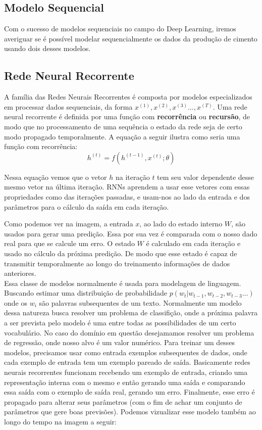 \subsection{Modelo Sequencial}
Com o sucesso de modelos sequenciais no campo do Deep Learning, iremos averiguar se é possível modelar sequencialmente os dados da produção de cimento usando dois desses modelos. 
\\

\subsection{Rede Neural Recorrente}
% 

A família das Redes Neurais Recorrentes é composta por modelos especializados
em processar dados sequenciais, da forma $x^{(1)},x^{(2)} ,x^{(3)}\dots ,x^{(T)}$. Uma rede neural recorrente é definida por uma função com
\textbf{recorrência} ou \textbf{recursão}, de modo que no processamento de uma
sequência o estado da rede seja de certo modo propagado temporalmente. A equação
a seguir ilustra como seria uma função com recorrência: \\

\[h^{(t)} = f(h^{(t-1)},x^{(t)};\theta)\]

Nessa equação vemos que o vetor $h$ na iteração $t$ tem seu valor dependente
desse mesmo vetor na última iteração. RNNs aprendem a usar esse vetores com
essas propriedades como
 das iterações passadas, e usam-nos ao lado da entrada e dos
parâmetros para o cálculo da saída em cada iteração.

Como podemos ver na imagem, a entrada $x$, ao lado do estado interno $W$, são usados para gerar uma predição. Essa por sua vez é comparada com o nosso dado real para que se calcule um erro. O estado $W$ é calculado em cada iteração e usado no cálculo da próxima predição. De modo que esse estado é capaz de transmitir temporalmente ao longo do treinamento informações de dados anteriores.
\\

Essa classe de modelos normalmente é usada para modelagem de linguagem. Buscando estimar uma distribuição de probabilidade $p(w_t | w_{t-1},w_{t-2},w_{t-3} \dots ) $ onde os $w_i$ são palavras subsequentes de um texto. Normalmente um modelo dessa natureza busca resolver um problema de classifição, onde a próxima palavra a ser prevista pelo modelo é uma entre todas as possibilidades de um certo vocabulário. No caso do domínio em questão desejamamos resolver um problema de regressão, onde nosso alvo é um valor numérico. Para treinar um desses modelos, precisamos usar como entrada exemplos subsequentes de dados, onde cada exemplo de entrada tem um exemplo pareado de saída. Basicamente redes neurais recorrentes funcionam recebendo um exemplo de entrada, criando uma representação interna com o mesmo e então gerando uma saída e comparando essa saída com o exemplo de saída real, gerando um erro. Finalmente, esse erro é propagado para alterar seus parâmetros (com o fim de achar um conjunto de parâmetros que gere boas previsões). Podemos vizualizar esse modelo também ao longo do tempo na imagem a seguir:



